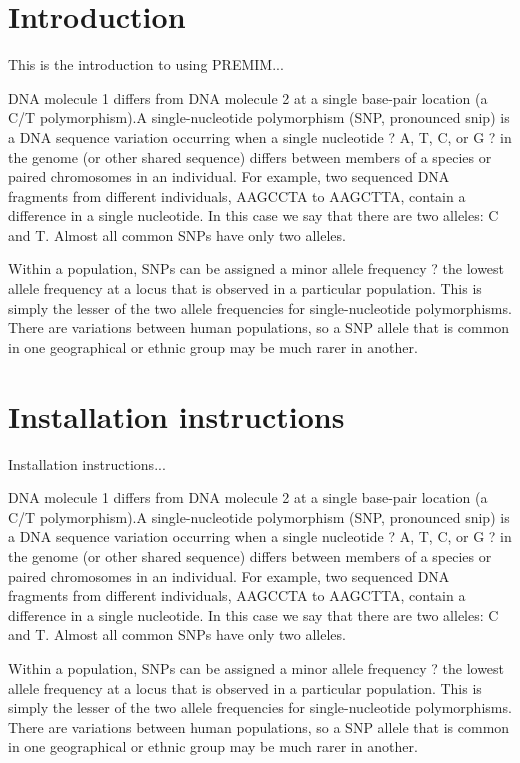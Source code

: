 \section{Introduction}
\label{introduction}

This is the introduction to using PREMIM... 

DNA molecule 1 differs from DNA molecule 2 at a single base-pair location (a C/T polymorphism).A single-nucleotide polymorphism (SNP, pronounced snip) is a DNA sequence variation occurring when a single nucleotide ? A, T, C, or G ? in the genome (or other shared sequence) differs between members of a species or paired chromosomes in an individual. For example, two sequenced DNA fragments from different individuals, AAGCCTA to AAGCTTA, contain a difference in a single nucleotide. In this case we say that there are two alleles: C and T. Almost all common SNPs have only two alleles. 

Within a population, SNPs can be assigned a minor allele frequency ? the lowest allele frequency at a locus that is observed in a particular population. This is simply the lesser of the two allele frequencies for single-nucleotide polymorphisms. There are variations between human populations, so a SNP allele that is common in one geographical or ethnic group may be much rarer in another. 

\section{Installation instructions}
\label{installation}

Installation instructions... 

DNA molecule 1 differs from DNA molecule 2 at a single base-pair location (a C/T polymorphism).A single-nucleotide polymorphism (SNP, pronounced snip) is a DNA sequence variation occurring when a single nucleotide ? A, T, C, or G ? in the genome (or other shared sequence) differs between members of a species or paired chromosomes in an individual. For example, two sequenced DNA fragments from different individuals, AAGCCTA to AAGCTTA, contain a difference in a single nucleotide. In this case we say that there are two alleles: C and T. Almost all common SNPs have only two alleles. 

Within a population, SNPs can be assigned a minor allele frequency ? the lowest allele frequency at a locus that is observed in a particular population. This is simply the lesser of the two allele frequencies for single-nucleotide polymorphisms. There are variations between human populations, so a SNP allele that is common in one geographical or ethnic group may be much rarer in another. 

